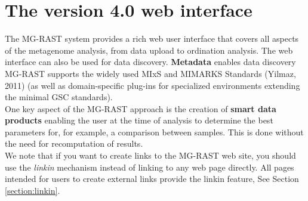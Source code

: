 \documentclass[12pt,fullpage]{report}
\begin{document}
\chapter{The version 4.0 web interface}
The MG-RAST system provides a rich web user interface that covers all aspects of the metagenome analysis, from data upload to ordination analysis. The web interface can also be used for data discovery.  \textbf{Metadata} enables data discovery MG-RAST supports the widely used MIxS and MIMARKS Standards (Yilmaz, 2011) (as well as domain-specific plug-ins for specialized environments extending the minimal GSC standards). \\


One key aspect of the MG-RAST approach is the creation of \textbf{smart data products} enabling the user at the time of analysis to determine the best parameters for, for example, a comparison between samples. This is done without the need for recomputation of results.\\




We note that if you want to create links to the MG-RAST web site, you should use the \textit{linkin} mechanism instead of linking to any web page directly. All pages intended for users to create external links provide the linkin feature, See Section \ref{section:linkin}.\\
\end{document}
